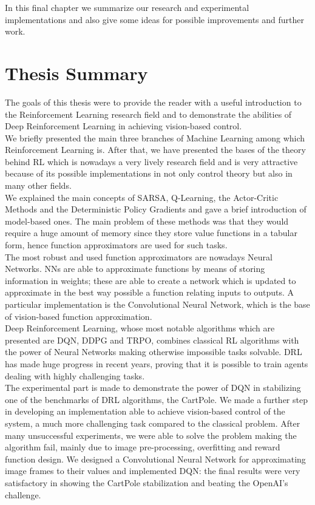 \label{ch:conclusion}

In this final chapter we summarize our research and experimental implementations and also give some ideas for possible improvements and further work.

\section{Thesis Summary}

The goals of this thesis were to provide the reader with a useful introduction to the Reinforcement Learning research field and to demonstrate the abilities of Deep Reinforcement Learning in achieving vision-based control.
\\
\indent We briefly presented the main three branches of Machine Learning among which Reinforcement Learning is. After that, we have presented the bases of the theory behind RL which is nowadays a very lively research field and is very attractive because of its possible implementations in not only control theory but also in many other fields.
\\
\indent We explained the main concepts of SARSA, Q-Learning, the Actor-Critic Methods and the Deterministic Policy Gradients and gave a brief introduction of model-based ones. The main problem of these methods was that they would require a huge amount of memory since they store value functions in a tabular form, hence function approximators are used for such tasks.
\\
\indent The most robust and used function approximators are nowadays Neural Networks. NNs are able to approximate functions by means of storing information in weights; these are able to create a network which is updated to approximate in the best way possible a function relating inputs to outputs. A particular implementation is the Convolutional Neural Network, which is the base of vision-based function approximation.
\\
\indent Deep Reinforcement Learning, whose most notable algorithms which are presented are DQN, DDPG and TRPO, combines classical RL algorithms with the power of Neural Networks making otherwise impossible tasks solvable. DRL has made huge progress in recent years, proving that it is possible to train agents dealing with highly challenging tasks.
\\
\indent The experimental part is made to demonstrate the power of DQN in stabilizing one of the benchmarks of DRL algorithms, the CartPole. We made a further step in developing an implementation able to achieve vision-based control of the system, a much more challenging task compared to the classical problem. After many unsuccessful experiments, we were able to solve the problem making the algorithm fail, mainly due to image pre-processing, overfitting and reward function design. We designed a Convolutional Neural Network for approximating image frames to their values and implemented DQN: the final results were very satisfactory in showing the CartPole stabilization and beating the OpenAI's challenge.

